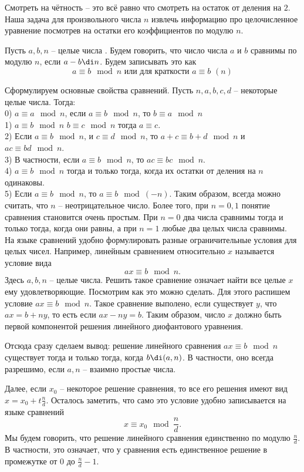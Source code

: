 Смотреть на чётность -- это всё равно что смотреть на остаток от деления на $2$. Наша задача для произвольного числа $n$ извлечь информацию про целочисленное уравнение посмотрев на  остатки его коэффициентов по модулю $n$.

\dfn Пусть $a,b,n$ -- целые числа . Будем говорить, что число числа $a$ и $b$ сравнимы по модулю $n$, если $a-b \di n$. Будем записывать это как $$a\equiv b \mod n \text{ или для краткости } a\equiv b \,\,(n)$$  
\edfn

Сформулируем основные свойства сравнений. Пусть $n, a,b,c, d$ --  некоторые целые числа. Тогда:\\
0) $a\equiv a \mod n$, если $a\equiv b \mod n$, то $b \equiv a \mod n$\\
1) $a\equiv b \mod n$ $b\equiv c \mod n$ тогда $a\equiv c$.\\
2) Если $a\equiv b \mod n$, и $c\equiv d \mod n$, то $a+c \equiv b+d \mod n$ и $ac\equiv bd \mod n$.\\
3) В частности, если $a\equiv b \mod  n$, то $ac\equiv bc \mod n$.\\
4) $a\equiv b \mod n$ тогда и только тогда, когда их остатки от деления на $n$ одинаковы.\\
5) Если $a\equiv b \mod n$, то $a\equiv b \mod (-n)$. Таким образом, всегда можно считать, что $n$ -- неотрицательное число. Более того, при $n=0,1$ понятие сравнения становится очень простым. При $n=0$ два числа сравнимы тогда и только тогда, когда они равны, а при $n=1$ любые два целых числа сравнимы.\\


На языке сравнений удобно формулировать разные ограничительные условия для целых чисел. Например, линейным сравнением относительно $x$ называется условие вида $$ax\equiv b \mod n .$$
Здесь $a,b,n$ -- целые числа. Решить такое сравнение означает найти все целые $x$ ему удовлетворяющие. Посмотрим как это можно сделать. Для этого распишем условие $ax\equiv b \mod n$. Такое сравнение выполено, если существует $y$, что $ax=b+ny$, то есть если $ax-ny=b$. Таким образом, число $x$ должно быть первой компонентой решения линейного диофантового уравнения. 

Отсюда сразу сделаем вывод: решение линейного сравнения $ax\equiv b \mod n$ существует тогда и только тогда, когда $b \di (a,n)$. В частности, оно всегда разрешимо, если $a,n$ -- взаимно простые числа. 

Далее, если $x_0$ -- некоторое решение сравнения, то все его решения имеют вид $x=x_0+t\frac{n}{d}$. Осталось заметить, что само это условие удобно записывается на языке сравнений $$x\equiv x_0 \mod \frac{n}{d}.$$ 
Мы будем говорить, что решение линейного сравнения единственно по модулю $\frac{n}{d}$. В частности, это означает, что у сравнения есть единственное решение в промежутке от $0$ до $\frac{n}{d}-1$.

